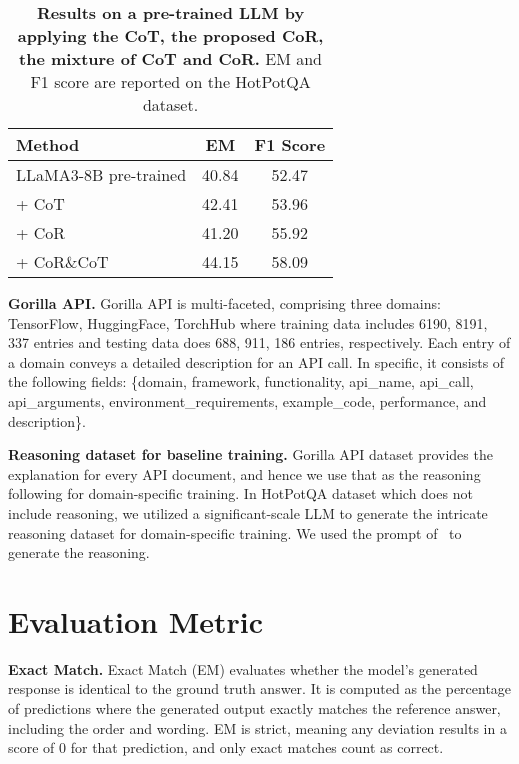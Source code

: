 \begin{table}[t]
  \centering
  \begin{adjustbox}{width=0.8\linewidth}
  \begin{tabular}{@{}lcc@{}}
    \toprule
    Method & EM & F1 Score \\
    \midrule
    LLaMA3-8B pre-trained &  40.84 & 52.47 \\
    \; + CoT & 42.41 & 53.96\\
    \; + CoR & 41.20 & 55.92 \\
    \; + CoR\&CoT & 44.15& 58.09 \\
    \bottomrule
    
  \end{tabular}
  \end{adjustbox}
  \caption{\textbf{Results on a pre-trained LLM by applying the CoT, the proposed CoR, the mixture of CoT and CoR.} EM and F1 score are reported on the HotPotQA dataset.}
  \label{tab:agnostic}
\end{table}

\noindent \textbf{Gorilla API.} Gorilla API is multi-faceted, comprising three domains: TensorFlow, HuggingFace, TorchHub where training data includes 6190, 8191, 337 entries and testing data does 688, 911, 186 entries, respectively. Each entry of a domain conveys a detailed description for an API call. In specific, it consists of the following fields: \{domain, framework, functionality, api\_name, api\_call, api\_arguments, environment\_requirements, example\_code, performance, and description\}.

\noindent \textbf{Reasoning dataset for baseline training.}
Gorilla API dataset provides the explanation for every API document, and hence we use that as the reasoning following \cite{RAFT} for domain-specific training. In HotPotQA dataset which does not include reasoning, we utilized a significant-scale LLM to generate the intricate reasoning dataset for domain-specific training. We used the prompt of~\cite{RAFT} to generate the reasoning.




\section{Evaluation Metric}
\noindent \textbf{Exact Match.} Exact Match (EM) evaluates whether the model’s generated response is identical to the ground truth answer. It is computed as the percentage of predictions where the generated output exactly matches the reference answer, including the order and wording. EM is strict, meaning any deviation results in a score of 0 for that prediction, and only exact matches count as correct.

